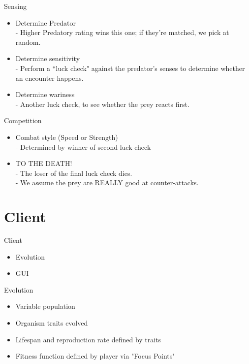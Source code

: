\documentclass[11pt]{beamer}
\begin{document}
\begin{frame}{Sensing}
\begin{itemize}
    \item Determine Predator
        \\ - Higher Predatory rating wins this one; if they're matched, we
            pick at random.
    \pause
    \item Determine sensitivity
        \\ - Perform a ``luck check" against the predator's senses to
            determine whether an encounter happens.
    \pause
    \item Determine wariness
        \\ - Another luck check, to see whether the prey reacts first.
\end{itemize}
\end{frame}

\begin{frame}{Competition}
\begin{itemize}
    \item Combat style (Speed or Strength)
        \\ - Determined by winner of second luck check
    \pause
    \item TO THE DEATH!
        \\ - The loser of the final luck check dies.
        \pause
        \\ - We assume the prey are REALLY good at counter-attacks.
\end{itemize}
\end{frame}

\section{Client}
\begin{frame}{Client}
\begin{itemize}
	\item Evolution
	\item GUI
\end{itemize}
\end{frame}

\begin{frame}{Evolution}
\begin{itemize}
	\item<1-> Variable population
	\item<2-> Organism traits evolved
	\item<3-> Lifespan and reproduction rate defined by traits
	\item<4-> Fitness function defined by player via "Focus Points"
\end{itemize}
\end{frame}
\end{document}
